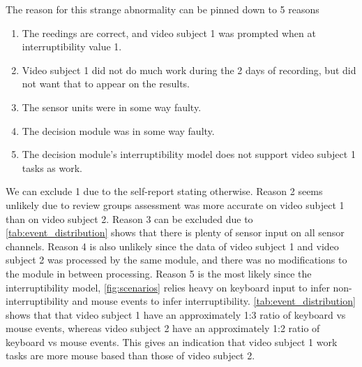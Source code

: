 \documentclass{sigchi}
\begin{document}
The reason for this strange abnormality can be pinned down to 5 reasons
\begin{enumerate}
  \item The reedings are correct, and video subject 1 was prompted when at interruptibility value 1.
  \item Video subject 1 did not do much work during the 2 days of recording, but did not want that to appear on the results.
  \item The sensor units were in some way faulty.
  \item The decision module was in some way faulty.
  \item The decision module's interruptibility model does not support video subject 1 tasks as work.
\end{enumerate}
We can exclude 1 due to the self-report stating otherwise. 
Reason 2 seems unlikely due to review groups assessment was more accurate on video subject 1 than on video subject 2.
Reason 3 can be excluded due to \autoref{tab:event_distribution} shows that there is plenty of sensor input on all sensor channels.
Reason 4 is also unlikely since the data of video subject 1 and video subject 2 was processed by the same module, and there was no modifications to the module in between processing.
Reason 5 is the most likely since the interruptibility model, \autoref{fig:scenarios} relies heavy on keyboard input to infer non-interruptibility and mouse events to infer interruptibility. \autoref{tab:event_distribution} shows that that video subject 1 have an approximately 1:3 ratio of keyboard vs mouse events, whereas video subject 2 have an approximately 1:2 ratio of keyboard vs mouse events. 
This gives an indication that video subject 1 work tasks are more mouse based than those of video subject 2.
\end{document}
